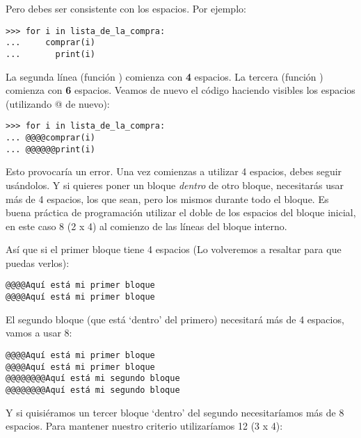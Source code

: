 Pero debes ser consistente con los espacios.  Por ejemplo:

\begin{listingignore}
\begin{verbatim}
>>> for i in lista_de_la_compra:
...     comprar(i)
...       print(i)
\end{verbatim}
\end{listingignore}

La segunda línea (función ) comienza con \textbf{4} espacios.  La tercera (función ) comienza con \textbf{6} espacios.  Veamos de nuevo el código haciendo visibles los espacios (utilizando @ de nuevo):

\begin{listingignore}
\begin{verbatim}
>>> for i in lista_de_la_compra:
... @@@@comprar(i)
... @@@@@@print(i)
\end{verbatim}
\end{listingignore}

Esto provocaría un error.  Una vez comienzas a utilizar 4 espacios, debes seguir usándolos.  Y si quieres poner un bloque \emph{dentro} de otro bloque, necesitarás usar más de 4 espacios, los que sean, pero los mismos durante todo el bloque.
Es buena práctica de programación utilizar el doble de los espacios del bloque inicial, en este caso 8 (2 x 4) al comienzo de las líneas del bloque interno. 
\par
Así que si el primer bloque tiene 4 espacios (Lo volveremos a resaltar para que puedas verlos):

\begin{listing}
\begin{verbatim}
@@@@Aquí está mi primer bloque
@@@@Aquí está mi primer bloque
\end{verbatim}
\end{listing}

El segundo bloque (que está `dentro' del primero) necesitará más de 4 espacios, vamos a usar 8:

\begin{listing}
\begin{verbatim}
@@@@Aquí está mi primer bloque
@@@@Aquí está mi primer bloque
@@@@@@@@Aquí está mi segundo bloque
@@@@@@@@Aquí está mi segundo bloque
\end{verbatim}
\end{listing}

Y si quisiéramos un tercer bloque `dentro' del segundo necesitaríamos más de 8 espacios. Para mantener nuestro criterio utilizaríamos 12 (3 x 4): 

